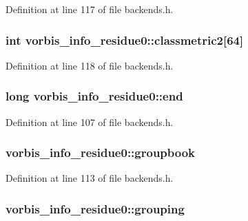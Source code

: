 Definition at line 117 of file backends.\+h.

\subsubsection[{\texorpdfstring{classmetric2}{classmetric2}}]{ {\bf int} vorbis\+\_\+info\+\_\+residue0\+::classmetric2\mbox{[}64\mbox{]}}\hypertarget{structvorbis__info__residue0_a45f75a88a42cd11eb058ec79effca129}{}\label{structvorbis__info__residue0_a45f75a88a42cd11eb058ec79effca129}


Definition at line 118 of file backends.\+h.

\subsubsection[{\texorpdfstring{end}{end}}]{\setlength{\rightskip}{0pt plus 5cm}long vorbis\+\_\+info\+\_\+residue0\+::end}\hypertarget{structvorbis__info__residue0_af8ce4aeb45a448181c3cd5079908627c}{}\label{structvorbis__info__residue0_af8ce4aeb45a448181c3cd5079908627c}


Definition at line 107 of file backends.\+h.

\subsubsection[{\texorpdfstring{groupbook}{groupbook}}]{ vorbis\+\_\+info\+\_\+residue0\+::groupbook}\hypertarget{structvorbis__info__residue0_aa3b476197866f9666cc4294f60273f84}{}\label{structvorbis__info__residue0_aa3b476197866f9666cc4294f60273f84}


Definition at line 113 of file backends.\+h.

\subsubsection[{\texorpdfstring{grouping}{grouping}}]{ vorbis\+\_\+info\+\_\+residue0\+::grouping}\hypertarget{structvorbis__info__residue0_afc030387b36d8397db6014464a8103c2}{}\label{structvorbis__info__residue0_afc030387b36d8397db6014464a8103c2}


